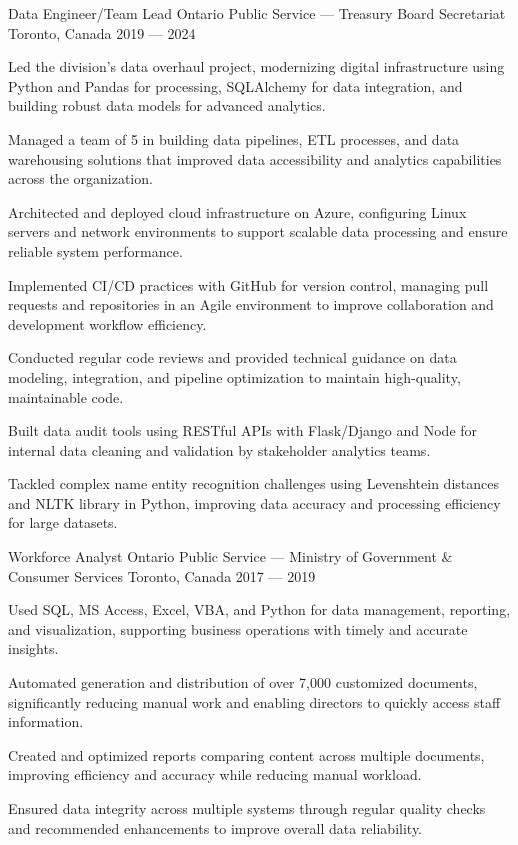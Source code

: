 \begin{cventries}
 \cventry%
 {Data Engineer/Team Lead}
 {Ontario Public Service --- Treasury Board Secretariat}
 {Toronto, Canada}
 {2019 --- 2024}
 {
    \begin{cvitems}
        \item Led the division's data overhaul project, modernizing digital infrastructure using Python and Pandas for processing, SQLAlchemy for data integration, and building robust data models for advanced analytics.
        \item Managed a team of 5 in building data pipelines, ETL processes, and data warehousing solutions that improved data accessibility and analytics capabilities across the organization.
        \item Architected and deployed cloud infrastructure on Azure, configuring Linux servers and network environments to support scalable data processing and ensure reliable system performance.
        \item Implemented CI/CD practices with GitHub for version control, managing pull requests and repositories in an Agile environment to improve collaboration and development workflow efficiency.
        \item Conducted regular code reviews and provided technical guidance on data modeling, integration, and pipeline optimization to maintain high-quality, maintainable code.
        \item Built data audit tools using RESTful APIs with Flask/Django and Node for internal data cleaning and validation by stakeholder analytics teams.
        \item Tackled complex name entity recognition challenges using Levenshtein distances and NLTK library in Python, improving data accuracy and processing efficiency for large datasets.
    \end{cvitems}
 }

\cventry%
	{Workforce Analyst}
	{Ontario Public Service --- Ministry of Government \& Consumer Services}
	{Toronto, Canada}
	{2017 --- 2019}
	{
		\begin{cvitems}
			\item Used SQL, MS Access, Excel, VBA, and Python for data management, reporting, and visualization, supporting business operations with timely and accurate insights.
			\item Automated generation and distribution of over 7,000 customized documents, significantly reducing manual work and enabling directors to quickly access staff information.
			\item Created and optimized reports comparing content across multiple documents, improving efficiency and accuracy while reducing manual workload.
			\item Ensured data integrity across multiple systems through regular quality checks and recommended enhancements to improve overall data reliability.
		\end{cvitems}
	}


\end{cventries}
